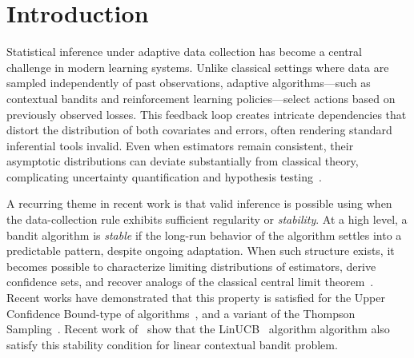 \documentclass[11pt,letterpaper]{article}
\theoremstyle{plain}
\theoremstyle{definition}  %
\begin{document}
\newcommand{\betastar}{\beta^\star}
\newcommand{\betahat}{\widehat{\beta}}
\newcommand{\betaold}{\widehat{\beta}_{\mathrm{OLS}}}


\section{Introduction}
Statistical inference under adaptive data collection has become a central challenge in modern learning systems. Unlike classical settings where data are sampled independently of past observations, adaptive algorithms—such as contextual bandits and reinforcement learning policies—select actions based on previously observed losses. This feedback loop creates intricate dependencies that distort the distribution of both covariates and errors, often rendering standard inferential tools invalid. Even when estimators remain consistent, their asymptotic distributions can deviate substantially from classical theory, complicating uncertainty quantification and hypothesis testing~\citep{dickey1979distribution,lai1982least,zhang2020inference,deshpande2023online,khamaru2021near}. 

A recurring theme in recent work is that valid inference is possible using when the data-collection rule exhibits sufficient regularity or \emph{stability}.
At a high level, a bandit algorithm is \emph{stable} if the long-run behavior of the algorithm settles into a predictable pattern, despite ongoing adaptation. When such structure exists, it becomes possible to characterize limiting distributions of estimators, derive confidence sets, and recover analogs of the classical central limit theorem~\citep{lai1982least}. Recent works have demonstrated that this property is satisfied for the Upper Confidence Bound-type of algorithms~\citep{kalvit2021closer,fan2022typical,khamaru2024inference,han2024ucb}, and a variant of the Thompson Sampling~\citep{halder2025stable,fan2022typical}. Recent work of~\cite{fan2025statistical} show that the LinUCB~\citep{li2010contextual,abbasi2011improved} algorithm algorithm also satisfy this stability condition for linear contextual bandit problem.   


\newcommand{\dims}{d}
\end{document}
